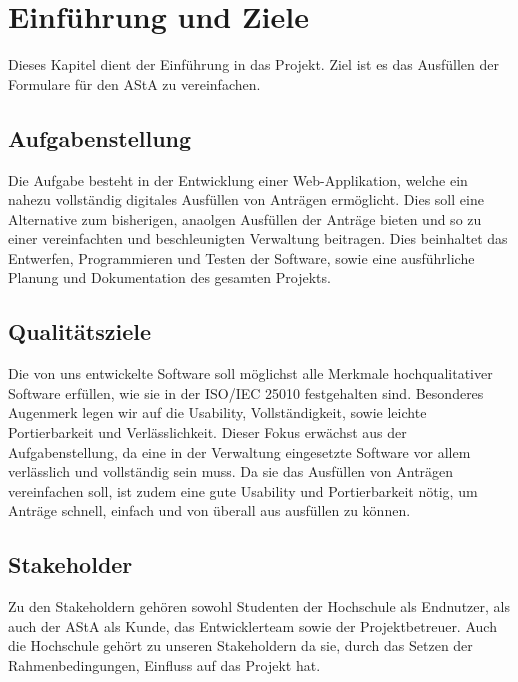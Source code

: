 \chapter{Einführung und Ziele}\label{ch:einfuhrung-und-ziele}

Dieses Kapitel dient der Einführung in das Projekt. 
Ziel ist es das Ausfüllen der Formulare für den \ac{AStA} zu vereinfachen. 

\section{Aufgabenstellung}\label{sec:aufgabenstellung}
Die Aufgabe besteht in der Entwicklung einer Web-Applikation, welche ein nahezu vollständig digitales
Ausfüllen von Anträgen ermöglicht. Dies soll eine Alternative zum bisherigen, anaolgen Ausfüllen der Anträge bieten und so zu einer vereinfachten und beschleunigten Verwaltung beitragen.
Dies beinhaltet das Entwerfen, Programmieren und Testen der Software, sowie eine ausführliche Planung und Dokumentation des gesamten Projekts.

\section{Qualitätsziele}\label{sec:qualitatsziele}
Die von uns entwickelte Software soll möglichst alle Merkmale hochqualitativer Software erfüllen, wie 
sie in der ISO/IEC 25010 festgehalten sind. Besonderes Augenmerk legen wir auf die Usability, 
Vollständigkeit, sowie leichte Portierbarkeit und Verlässlichkeit. Dieser Fokus erwächst aus der
Aufgabenstellung, da eine in der Verwaltung eingesetzte Software vor allem verlässlich und vollständig
sein muss. Da sie das Ausfüllen von Anträgen vereinfachen soll, ist zudem eine gute Usability und
Portierbarkeit nötig, um Anträge schnell, einfach und von überall aus ausfüllen zu können.

\section{Stakeholder}\label{sec:stakeholder}
Zu den Stakeholdern gehören sowohl Studenten der Hochschule als Endnutzer, als auch
der \ac{AStA} als Kunde, das Entwicklerteam sowie der Projektbetreuer. Auch die Hochschule
gehört zu unseren Stakeholdern da sie, durch das Setzen der Rahmenbedingungen, Einfluss auf das 
Projekt hat.